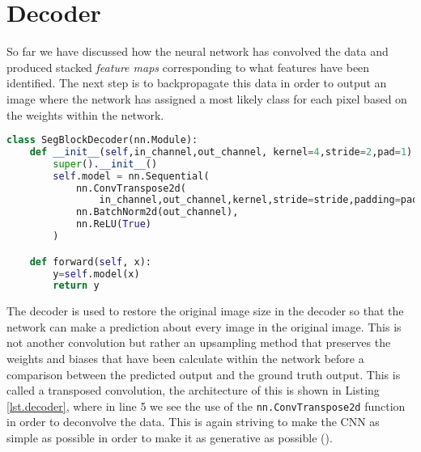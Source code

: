 \section{Decoder}
So far we have discussed how the neural network has convolved the data and produced stacked \textit{feature maps} corresponding to what features have been identified. The next step is to backpropagate this data in order to output an image where the network has assigned a most likely class for each pixel based on the weights within the network. 
\begin{lstlisting}[language=Python, caption = {Decoder architecture, works in the opposite way to the Encoder to transpose so that dimensions match that of the ground truth for comparison.}, label={lst.decoder},float,floatplacement=htbp]
class SegBlockDecoder(nn.Module):
    def __init__(self,in_channel,out_channel, kernel=4,stride=2,pad=1):
        super().__init__()
        self.model = nn.Sequential(
            nn.ConvTranspose2d(
                in_channel,out_channel,kernel,stride=stride,padding=pad,bias=False),
            nn.BatchNorm2d(out_channel),
            nn.ReLU(True)
        )

    def forward(self, x):
        y=self.model(x)
        return y
\end{lstlisting}
The decoder is used to restore the original image size in the decoder so that the network can make a prediction about every image in the original image. This is not another convolution but rather an upsampling method that preserves the weights and biases that have been calculate within the network before a comparison between the predicted output and the ground truth output. This is called a transposed convolution, the architecture of this is shown in Listing \ref{lst.decoder}, where in line 5 we see the use of the \texttt{nn.ConvTranspose2d} function in order to deconvolve the data. This is again striving to make the CNN as simple as possible in order to make it as generative as possible (\cite{Springenberg14}).

